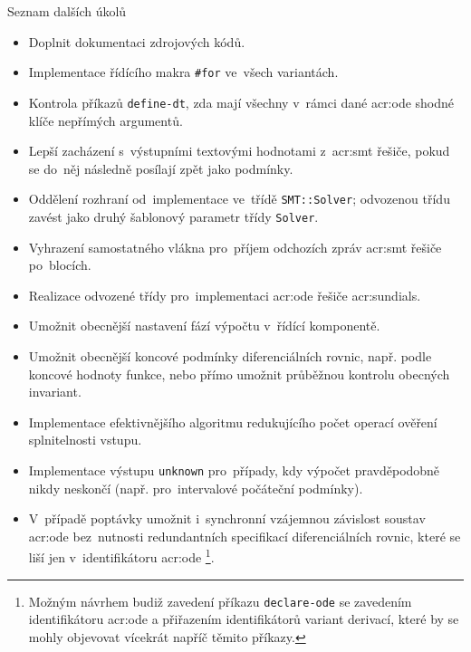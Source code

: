 \documentclass[thesis=M,czech]{FITthesis}[2012/06/26]
\newcommand{\acrlabel}[1]{acr:#1}
\newcommand{\acr}[1]{\acrshort{\acrlabel{#1}}}
\newcommand{\id}[1]{\texttt{#1}}
\begin{document}

\begin{section}{Seznam dalších úkolů}\label{s:impl:todo}
\begin{itemize}
\item Doplnit dokumentaci zdrojových kódů.
\item Implementace řídícího makra \id{\#for} ve~všech variantách.
\item Kontrola příkazů \id{define\--dt}, zda mají všechny
   v~rámci dané \acr{ode} shodné klíče nepřímých argumentů.
\item Lepší zacházení s~výstupními textovými hodnotami z~\acr{smt}
   řešiče, pokud se do~něj následně posílají zpět jako podmínky.
\item Oddělení rozhraní od~implementace ve~třídě \id{SMT::\-Solver};
   odvozenou třídu zavést jako druhý šablonový parametr třídy \id{Solver}.
\item Vyhrazení samostatného vlákna pro~příjem
   odchozích zpráv \acr{smt} řešiče po~blocích.
\item Realizace odvozené třídy pro~implementaci
   \acr{ode} řešiče \acr{sundials}.
\item Umožnit obecnější nastavení fází výpočtu v~řídící komponentě.
\item Umožnit obecnější koncové podmínky diferenciálních rovnic,
   např. podle koncové hodnoty funkce,
   nebo přímo umožnit průběžnou kontrolu obecných invariant.
\item Implementace efektivnějšího algoritmu
   redukujícího počet operací ověření splnitelnosti vstupu.
\item Implementace výstupu \id{unknown} pro~případy,
   kdy výpočet pravděpodobně nikdy neskončí
   (např. pro~intervalové počáteční podmínky).
\item V~případě poptávky umožnit i~synchronní
   vzájemnou závislost soustav \acr{ode}
   bez~nutnosti redundantních
   specifikací diferenciálních rovnic,
   které se liší jen v~identifikátoru \acr{ode}%
   \footnote{Možným návrhem budiž zavedení příkazu
   \id{declare\--ode} se zavedením identifikátoru \acr{ode}
   a přiřazením identifikátorů variant derivací,
   které by se mohly objevovat vícekrát napříč těmito příkazy.}.
\end{itemize}
\end{section} %


\end{document}
